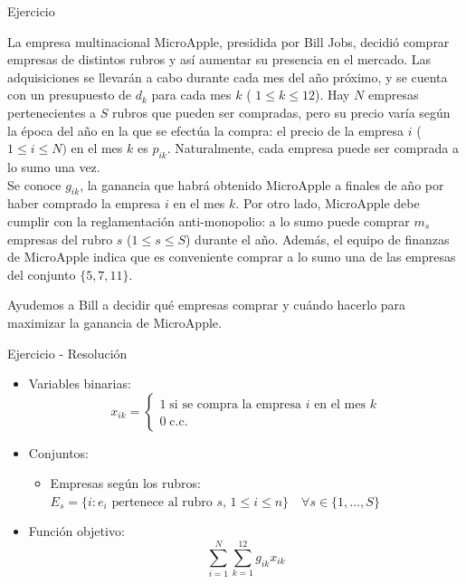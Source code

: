 \documentclass[10pt, aspectratio=169]{beamer}
\newif\ifCompleta
\begin{document}
\begin{frame}{Ejercicio}

    \parbox{\linewidth}{ La empresa multinacional MicroApple, presidida por Bill Jobs,
        decidió comprar empresas de distintos rubros y así aumentar su presencia en el mercado. Las adquisiciones se
        llevarán a cabo durante cada mes del año próximo, y se cuenta con un presupuesto de $d_k$ para cada mes $k$ (
        $1\leq k\leq 12 $). Hay $N$ empresas pertenecientes a $S$ rubros que pueden ser compradas,
        pero su precio varía según la época del año en la que se efectúa la compra: el precio de la empresa $i$ (
        $1\leq i\leq N)$ en el mes $k$ es $p_{ik}$. Naturalmente, cada empresa puede ser comprada a lo sumo una vez.\\

        Se conoce $g_{ik}$, la ganancia que habrá obtenido MicroApple a finales de año por haber comprado la empresa $i$
        en el mes $k$.
        Por otro lado, MicroApple debe cumplir con la reglamentación anti-monopolio: a lo sumo puede comprar $m_s$
        empresas del rubro $s$ ($1\leq s \leq S$) durante el año. Además, el equipo de finanzas de MicroApple indica que es
        conveniente comprar a lo sumo una de las empresas del conjunto $\{5, 7, 11\}$.

        Ayudemos a Bill a decidir qué empresas comprar y cuándo hacerlo para maximizar la ganancia de MicroApple.
    }
\end{frame}

\ifCompleta
\begin{frame}{Ejercicio - Resolución}
    \begin{itemize}
        \item Variables binarias:
        \[ x_{ik}= \begin{cases} 1 \; \text{si se compra la empresa $i$ en el mes $k$} \\
        0 \; \text{c.c.}
        \end{cases}
        \]
        \item Conjuntos:
        \begin{itemize}
            \item[$\blacktriangleright$] Empresas según los rubros: $E_s = \{i: \text{$e_i$ pertenece al rubro $s$},\, 1\leq i \leq n \} \quad \forall s\in \{1,\dots, S\}$
        \end{itemize}
        \item Función objetivo:
        \[ \sum_{i=1}^N \sum_{k=1}^{12} g_{ik}x_{ik}\]
    \end{itemize}
\end{frame}
\end{document}

